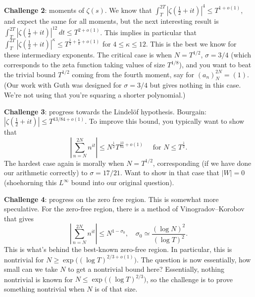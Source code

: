 \documentclass[reqno]{amsart} 
\numberwithin{theorem}{section}
\numberwithin{equation}{section}
\begin{document}
\textbf{Challenge 2}: moments of $\zeta(s)$.  We know that $\int_{T}^{2 T} \left\lvert \zeta(\tfrac{1}{2} + i t) \right\rvert^{4} \leq T^{1 + o(1)}$, and expect the same for all moments, but the next interesting result is $\int_T^{2 T} \left\lvert \zeta(\tfrac{1}{2} + i t) \right\rvert^{12} \, d t \leq T^{2 + o(1)}$.  This implies in particular that $\int_T^{2 T} \left\lvert \zeta(\tfrac{1}{2} + i t) \right\rvert^{\kappa} \leq T^{\tfrac{1}{2} + \tfrac{\kappa}{8} + o(1)}$ for $4 \leq \kappa \leq 12$.  This is the best we know for these intermediary exponents.  The critical case is when $N = T^{1/2}$, $\sigma = 3/4$ (which corresponds to the zeta function taking values of size $T^{1/8}$), and you want to beat the trivial bound $T^{1/2}$ coming from the fourth moment, say for $(a_n)_N^{2 N} =(1)$.  (Our work with Guth was designed for $\sigma = 3/4$ but gives nothing in this case.  We're not using that you're squaring a shorter polynomial.)

\textbf{Challenge 3}: progress towards the Lindelöf hypothesis.  Bourgain: $\left\lvert \zeta(\tfrac{1}{2} + i t) \right\rvert \leq T^{13/84 + o(1)}$.  To improve this bound, you typically want to show that
\begin{equation*}
  \left\lvert \sum_{n = N}^{2 N} n^{i t} \right\rvert
  \leq N^{\tfrac{1}{2}} T^{\tfrac{13}{84} + o(1)}
  \quad \text{ for } N \leq T^{\tfrac{1}{2}}.
\end{equation*}
The hardest case again is morally when $N = T^{1/2}$, corresponding (if we have done our arithmetic correctly) to $\sigma = 17/21$.  Want to show in that case that $\lvert W \rvert = 0$ (shoehorning this $L^\infty$ bound into our original question).

\textbf{Challenge 4}: progress on the zero free region.  This is somewhat more speculative.  For the zero-free region, there is a method of Vinogradov--Korobov that gives
\begin{equation*}
  \left\lvert \sum_{n = N}^{2 N} n^{i t} \right\rvert
  \leq N^{1 - \sigma_0}, \quad
  \sigma_0 \simeq \frac{(\log N)^2}{(\log T)^2}.
\end{equation*}
This is what's behind the best-known zero-free region.  In particular, this is nontrivial for $N \geq \exp\bigl((\log T)^{2/3 + o(1)}\bigr)$.  The question is now essentially, how small can we take $N$ to get a nontrivial bound here?  Essentially, nothing nontrivial is known for $N \leq \exp\bigl((\log T)^{2/3}\bigr)$, so the challenge is to prove something nontrivial when $N$ is of that size.
\end{document}
